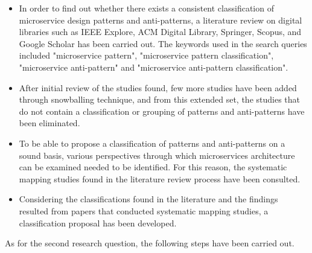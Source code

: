 \documentclass[11pt,a4paper,twocolumn]{article}
\begin{document}
\begin{itemize}
    \item In order to find out whether there exists a consistent classification of microservice design patterns and anti-patterns, a literature review on digital libraries such as IEEE Explore, ACM Digital Library, Springer, Scopus, and Google Scholar has been carried out.
    The keywords used in the search queries included "microservice pattern", "microservice pattern classification", "microservice anti-pattern" and "microservice anti-pattern classification".

    \item After initial review of the studies found, few more studies have been added through snowballing technique, and from this extended set, the studies that do not contain a classification or grouping of patterns and anti-patterns have been eliminated.
    
    \item To be able to propose a classification of patterns and anti-patterns on a sound basis, various perspectives through which microservices architecture can be examined needed to be identified.
    For this reason, the systematic mapping studies found in the literature review process have been consulted.
    
    \item Considering the classifications found in the literature and the findings resulted from papers that conducted systematic mapping studies, a classification proposal has been developed.
\end{itemize}

As for the second research question, the following steps have been carried out.
\end{document}
